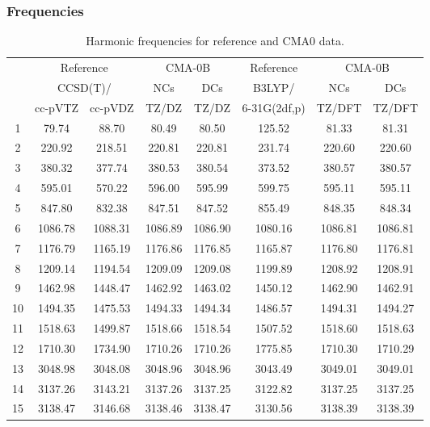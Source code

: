 \documentclass[10pt,oneside]{article}
\begin{document}
\subsubsection*{Frequencies}
\begin{table}[h!]
\centering
\caption{Harmonic frequencies for reference and CMA0 data.}
\begin{tabular}{cccccccc}
\toprule
{} & \multicolumn{2}{c}{Reference} & \multicolumn{2}{c}{CMA-0B} &    Reference & \multicolumn{2}{c}{CMA-0B} \\
{} & \multicolumn{2}{c}{CCSD(T)/} &     NCs &     DCs &       B3LYP/ &     NCs &     DCs \\
{} &   cc-pVTZ & cc-pVDZ &   TZ/DZ &   TZ/DZ & 6-31G(2df,p) &  TZ/DFT &  TZ/DFT \\
\midrule
1  &     79.74 &   88.70 &   80.49 &   80.50 &       125.52 &   81.33 &   81.31 \\
2  &    220.92 &  218.51 &  220.81 &  220.81 &       231.74 &  220.60 &  220.60 \\
3  &    380.32 &  377.74 &  380.53 &  380.54 &       373.52 &  380.57 &  380.57 \\
4  &    595.01 &  570.22 &  596.00 &  595.99 &       599.75 &  595.11 &  595.11 \\
5  &    847.80 &  832.38 &  847.51 &  847.52 &       855.49 &  848.35 &  848.34 \\
6  &   1086.78 & 1088.31 & 1086.89 & 1086.90 &      1080.16 & 1086.81 & 1086.81 \\
7  &   1176.79 & 1165.19 & 1176.86 & 1176.85 &      1165.87 & 1176.80 & 1176.81 \\
8  &   1209.14 & 1194.54 & 1209.09 & 1209.08 &      1199.89 & 1208.92 & 1208.91 \\
9  &   1462.98 & 1448.47 & 1462.92 & 1463.02 &      1450.12 & 1462.90 & 1462.91 \\
10 &   1494.35 & 1475.53 & 1494.33 & 1494.34 &      1486.57 & 1494.31 & 1494.27 \\
11 &   1518.63 & 1499.87 & 1518.66 & 1518.54 &      1507.52 & 1518.60 & 1518.63 \\
12 &   1710.30 & 1734.90 & 1710.26 & 1710.26 &      1775.85 & 1710.30 & 1710.29 \\
13 &   3048.98 & 3048.08 & 3048.96 & 3048.96 &      3043.49 & 3049.01 & 3049.01 \\
14 &   3137.26 & 3143.21 & 3137.26 & 3137.25 &      3122.82 & 3137.25 & 3137.25 \\
15 &   3138.47 & 3146.68 & 3138.46 & 3138.47 &      3130.56 & 3138.39 & 3138.39 \\
\bottomrule
\end{tabular}
\end{table}
\end{document}
